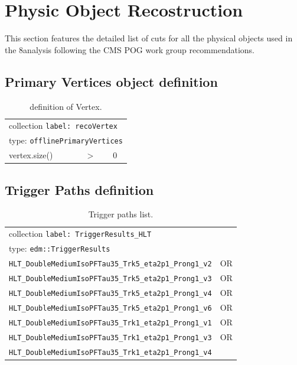 \section{Physic Object Recostruction}

This section features the detailed list of cuts for all the physical objects used in the 8\tev analysis following the CMS POG work group recommendations.

\subsection{Primary Vertices object definition}

\begin{table}[htb]
	\caption{definition of Vertex.}
	\label{table:vertexobjdefinition}
	\ttfamily\scriptsize\selectfont
	\begin{center}
		\begin{tabular}{|l|ll|}
			\hline
			\multicolumn{3}{|l|}{collection \texttt{label: recoVertex}}\\
			\multicolumn{3}{|l|}{type: \texttt{offlinePrimaryVertices}}\\
			\hline
			vertex.size() & $>$ & 0 \\
			\hline
		\end{tabular}
	\end{center}
\end{table}

\subsection{Trigger Paths definition}

\begin{table}[htb]

	\caption{Trigger paths list.}
	\label{table:triggerdefinition}
	\ttfamily\scriptsize\selectfont
	\begin{center}
		\begin{tabular}{|l|l|}
			\hline
			\multicolumn{2}{|l|}{collection \texttt{label: TriggerResults\_HLT}}\\
			\multicolumn{2}{|l|}{type: \texttt{edm::TriggerResults}}\\
			\hline
			\texttt{HLT\_DoubleMediumIsoPFTau35\_Trk5\_eta2p1\_Prong1\_v2} & OR \\
			\texttt{HLT\_DoubleMediumIsoPFTau35\_Trk5\_eta2p1\_Prong1\_v3} & OR \\
			\texttt{HLT\_DoubleMediumIsoPFTau35\_Trk5\_eta2p1\_Prong1\_v4} & OR \\
			\texttt{HLT\_DoubleMediumIsoPFTau35\_Trk5\_eta2p1\_Prong1\_v6} & OR \\
			\texttt{HLT\_DoubleMediumIsoPFTau35\_Trk1\_eta2p1\_Prong1\_v1} & OR \\
			\texttt{HLT\_DoubleMediumIsoPFTau35\_Trk1\_eta2p1\_Prong1\_v3} & OR \\
			\texttt{HLT\_DoubleMediumIsoPFTau35\_Trk1\_eta2p1\_Prong1\_v4} & \\
			\hline
		\end{tabular}
	\end{center}
\end{table}


